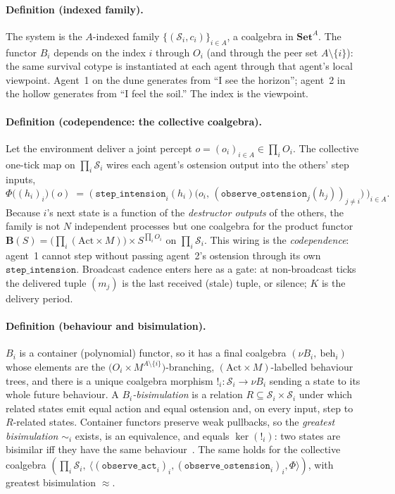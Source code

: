 \documentclass{article}
\newcommand{\method}[1]{\texttt{#1}}
\begin{document}
\paragraph{Definition (indexed family).}
The system is the $A$-indexed family $\{(\mathcal{S}_i,c_i)\}_{i\in A}$, a
coalgebra in $\mathbf{Set}^{A}$. The functor $B_i$ depends on the index $i$
through $O_i$ (and through the peer set $A\setminus\{i\}$): the same survival
cotype is instantiated at each agent through that agent's local viewpoint.
Agent~1 on the dune generates from ``I see the horizon''; agent~2 in the
hollow generates from ``I feel the soil.'' The index is the viewpoint.

\paragraph{Definition (codependence: the collective coalgebra).}
Let the environment deliver a joint percept $o=(o_i)_{i\in A}\in\prod_i O_i$.
The collective one-tick map on $\prod_i\mathcal{S}_i$ wires each agent's
ostension output into the others' step inputs,
\[
  \Phi\big((h_i)_i\big)(o)\;=\;
  \Big(\ \method{step\_intension}_i(h_i)\big(o_i,\,(\method{observe\_ostension}_j(h_j))_{j\neq i}\big)\ \Big)_{i\in A}.
\]
Because $i$'s next state is a function of the \emph{destructor outputs} of
the others, the family is not $N$ independent processes but one coalgebra for
the product functor $\mathbf{B}(S)=\big(\prod_i(\mathrm{Act}\times M)\big)\times S^{\prod_i O_i}$
on $\prod_i\mathcal{S}_i$. This wiring is the \emph{codependence}: agent~1
cannot step without passing agent~2's ostension through its own
$\method{step\_intension}$. Broadcast cadence enters here as a gate: at
non-broadcast ticks the delivered tuple $(m_j)$ is the last received (stale)
tuple, or silence; $K$ is the delivery period.

\paragraph{Definition (behaviour and bisimulation).}
$B_i$ is a container (polynomial) functor, so it has a final coalgebra
$(\nu B_i,\ \mathrm{beh}_i)$~\citep{aczel1988nonwellfounded,rutten2000universal} whose elements are the $\big(O_i\times M^{A\setminus\{i\}}\big)$-branching,
$(\mathrm{Act}\times M)$-labelled behaviour trees, and there is a unique
coalgebra morphism $!_i:\mathcal{S}_i\to\nu B_i$ sending a state to its whole
future behaviour. A \emph{$B_i$-bisimulation} is a relation
$R\subseteq\mathcal{S}_i\times\mathcal{S}_i$ under which related states emit
equal action and equal ostension and, on every input, step to $R$-related
states. Container functors preserve weak pullbacks, so the \emph{greatest
bisimulation} $\sim_i$ exists, is an equivalence, and equals $\ker(!_i)$:
two states are bisimilar iff they have the same behaviour~\citep{sangiorgi2011bisimulation}. The same holds for
the collective coalgebra $(\prod_i\mathcal{S}_i,\ \langle(\method{observe\_act}_i)_i,(\method{observe\_ostension}_i)_i,\Phi\rangle)$,
with greatest bisimulation $\approx$.
\end{document}

